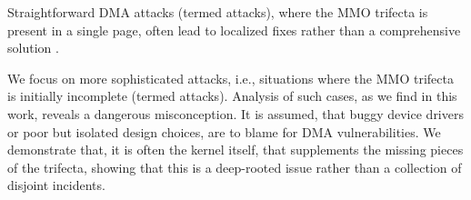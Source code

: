 Straightforward DMA attacks (termed \simple attacks), where the MMO trifecta is present in a single page, often lead to localized fixes rather than a comprehensive solution \cite{thunder}.

We focus on more sophisticated attacks, i.e., situations where the MMO trifecta is initially incomplete (termed \compound attacks).
Analysis of such cases, as we find in this work, reveals a dangerous misconception. It is assumed, that buggy device drivers or poor but isolated design choices, are to blame for DMA vulnerabilities. 
We demonstrate that, it is often the kernel itself, that supplements the missing pieces of the trifecta, showing that this is a deep-rooted issue rather than a collection of disjoint incidents.

